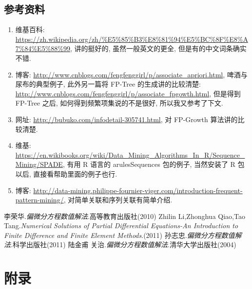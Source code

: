 \documentclass[a4paper,UTF8]{ctexart}
\theoremstyle{plain} \newtheorem{theorem}{定理}[section]
\theoremstyle{plain} \newtheorem{definition}{定义}[section]
\theoremstyle{plain} \newtheorem{lemma}{引理}[section]
\theoremstyle{plain} \newtheorem{proposition}{命题}[section]
\theoremstyle{plain} \newtheorem{example}{例}[section]
\theoremstyle{plain} \newtheorem{remark}{注}[section]
\theoremstyle{plain} \newtheorem{corollary}{推论}[section]
\begin{document}
\subsection{参考资料}
\begin{enumerate}[(1)]
\item 维基百科: \url{https://zh.wikipedia.org/zh/%E5%85%B3%E8%81%94%E5%BC%8F%E8%A7%84%E5%88%99}, 讲的挺好的, 虽然一般英文的更全, 但是有的中文词条确实不错.

\item 博客: \url{http://www.cnblogs.com/fengfenggirl/p/associate_apriori.html}, 啤酒与尿布的典型例子, 此外另一篇将 FP-Tree 的生成讲的比较清楚: \url{http://www.cnblogs.com/fengfenggirl/p/associate_fpgowth.html}, 但是得到 FP-Tree 之后, 如何得到频繁项集说的不是很好, 所以我又参考了下文.

\item 网址: \url{http://bubuko.com/infodetail-305741.html}, 对 FP-Growth 算法讲的比较清楚.

\item 维基: \url{https://en.wikibooks.org/wiki/Data_Mining_Algorithms_In_R/Sequence_Mining/SPADE}, 有用 R 语言的 arulesSequences 包的例子, 当然安装了 R 包以后, 直接看帮助里面的例子也行.

\item 博客: \url{http://data-mining.philippe-fournier-viger.com/introduction-frequent-pattern-mining/}, 对简单关联和序列关联有简单介绍.
\end{enumerate}








\begin{thebibliography}{4}
   李荣华.\emph{偏微分方程数值解法}.高等教育出版社(2010) 
   Zhilin Li,Zhonghua Qiao,Tao Tang.\emph{Numerical Solutions of Partial Differential Equations-An Introduction to Finite Difference and Finite Element Methods}.(2011)
   孙志忠.\emph{偏微分方程数值解法}.科学出版社(2011)
   陆金甫 关治.\emph{偏微分方程数值解法}.清华大学出版社(2004)
  
\end{thebibliography}

\newpage

\section*{附录}
\end{document}
